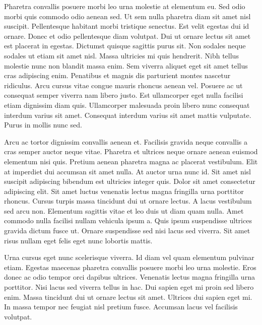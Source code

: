 Pharetra convallis posuere morbi leo urna molestie at elementum eu. Sed odio morbi quis commodo odio aenean sed. Ut sem nulla pharetra diam sit amet nisl suscipit. Pellentesque habitant morbi tristique senectus. Est velit egestas dui id ornare. Donec et odio pellentesque diam volutpat. Dui ut ornare lectus sit amet est placerat in egestas. Dictumst quisque sagittis purus sit. Non sodales neque sodales ut etiam sit amet nisl. Massa ultricies mi quis hendrerit. Nibh tellus molestie nunc non blandit massa enim. Sem viverra aliquet eget sit amet tellus cras adipiscing enim. Penatibus et magnis dis parturient montes nascetur ridiculus. Arcu cursus vitae congue mauris rhoncus aenean vel. Posuere ac ut consequat semper viverra nam libero justo. Est ullamcorper eget nulla facilisi etiam dignissim diam quis. Ullamcorper malesuada proin libero nunc consequat interdum varius sit amet. Consequat interdum varius sit amet mattis vulputate. Purus in mollis nunc sed.

Arcu ac tortor dignissim convallis aenean et. Facilisis gravida neque convallis a cras semper auctor neque vitae. Pharetra et ultrices neque ornare aenean euismod elementum nisi quis. Pretium aenean pharetra magna ac placerat vestibulum. Elit at imperdiet dui accumsan sit amet nulla. At auctor urna nunc id. Sit amet nisl suscipit adipiscing bibendum est ultricies integer quis. Dolor sit amet consectetur adipiscing elit. Sit amet luctus venenatis lectus magna fringilla urna porttitor rhoncus. Cursus turpis massa tincidunt dui ut ornare lectus. A lacus vestibulum sed arcu non. Elementum sagittis vitae et leo duis ut diam quam nulla. Amet commodo nulla facilisi nullam vehicula ipsum a. Quis ipsum suspendisse ultrices gravida dictum fusce ut. Ornare suspendisse sed nisi lacus sed viverra. Sit amet risus nullam eget felis eget nunc lobortis mattis.

Urna cursus eget nunc scelerisque viverra. Id diam vel quam elementum pulvinar etiam. Egestas maecenas pharetra convallis posuere morbi leo urna molestie. Eros donec ac odio tempor orci dapibus ultrices. Venenatis lectus magna fringilla urna porttitor. Nisi lacus sed viverra tellus in hac. Dui sapien eget mi proin sed libero enim. Massa tincidunt dui ut ornare lectus sit amet. Ultrices dui sapien eget mi. In massa tempor nec feugiat nisl pretium fusce. Accumsan lacus vel facilisis volutpat.